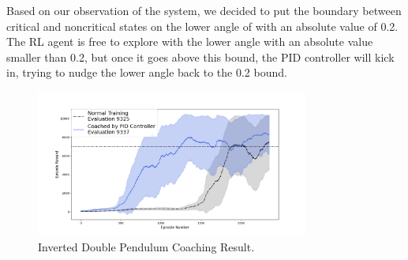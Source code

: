 Based on our observation of the system, we decided to put the boundary between critical and noncritical states on the lower angle of with an absolute value of 0.2. The RL agent is free to explore with the lower angle with an absolute value smaller than 0.2, but once it goes above this bound, the PID controller will kick in, trying to nudge the lower angle back to the 0.2 bound.

\begin{figure}[H]
     \centering
      \includegraphics[width=0.8\textwidth]{double.png}
      \caption{Inverted Double Pendulum Coaching Result.}
      \label{fig:double_result}
\end{figure}
